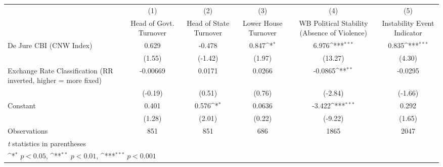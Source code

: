 {
\def\sym#1{\ifmmode^{#1}\else\(^{#1}\)\fi}
\begin{tabular*}{\linewidth}{@{\hskip\tabcolsep\extracolsep\fill}l*{5}{c}}
\hline\hline
                &\multicolumn{1}{c}{(1)}&\multicolumn{1}{c}{(2)}&\multicolumn{1}{c}{(3)}&\multicolumn{1}{c}{(4)}&\multicolumn{1}{c}{(5)}\\
                &\multicolumn{1}{c}{Head of Govt. Turnover}&\multicolumn{1}{c}{Head of State Turnover}&\multicolumn{1}{c}{Lower House Turnover}&\multicolumn{1}{c}{WB Political Stability (Absence of Violence)}&\multicolumn{1}{c}{Instability Event Indicator}\\
\hline
De Jure CBI (CNW Index)&    0.629         &   -0.478         &    0.847\sym{*}  &    6.976\sym{***}&    0.835\sym{***}\\
                &   (1.55)         &  (-1.42)         &   (1.97)         &  (13.27)         &   (4.30)         \\
[1em]
Exchange Rate Classification (RR inverted, higher = more fixed)& -0.00669         &   0.0171         &   0.0266         &  -0.0865\sym{**} &  -0.0295         \\
                &  (-0.19)         &   (0.51)         &   (0.76)         &  (-2.84)         &  (-1.66)         \\
[1em]
Constant        &    0.401         &    0.576\sym{*}  &   0.0636         &   -3.422\sym{***}&    0.292         \\
                &   (1.28)         &   (2.01)         &   (0.22)         &  (-9.22)         &   (1.65)         \\
\hline
Observations    &      851         &      851         &      686         &     1865         &     2047         \\
\hline\hline
\multicolumn{6}{l}{\footnotesize \textit{t} statistics in parentheses}\\
\multicolumn{6}{l}{\footnotesize \sym{*} \(p<0.05\), \sym{**} \(p<0.01\), \sym{***} \(p<0.001\)}\\
\end{tabular*}
}
